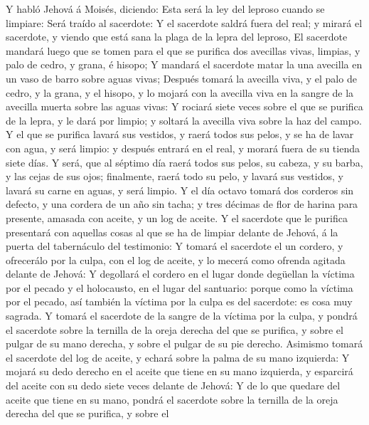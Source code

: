  Y habló Jehová á Moisés, diciendo:  Esta
será la ley del leproso cuando se limpiare: Será traído al sacerdote:
 Y el sacerdote saldrá fuera del real; y mirará el
sacerdote, y viendo que está sana la plaga de la lepra del leproso,
 El sacerdote mandará luego que se tomen para el que se
purifica dos avecillas vivas, limpias, y palo de cedro, y grana, é
hisopo;  Y mandará el sacerdote matar la una avecilla en
un vaso de barro sobre aguas vivas;  Después tomará la
avecilla viva, y el palo de cedro, y la grana, y el hisopo, y lo mojará
con la avecilla viva en la sangre de la avecilla muerta sobre las aguas
vivas:  Y rociará siete veces sobre el que se purifica de
la lepra, y le dará por limpio; y soltará la avecilla viva sobre la haz
del campo.  Y el que se purifica lavará sus vestidos, y
raerá todos sus pelos, y se ha de lavar con agua, y será limpio: y
después entrará en el real, y morará fuera de su tienda siete días.
 Y será, que al séptimo día raerá todos sus pelos, su
cabeza, y su barba, y las cejas de sus ojos; finalmente, raerá todo su
pelo, y lavará sus vestidos, y lavará su carne en aguas, y será limpio.
 Y el día octavo tomará dos corderos sin defecto, y una
cordera de un año sin tacha; y tres décimas de flor de harina para
presente, amasada con aceite, y un log de aceite.  Y el
sacerdote que le purifica presentará con aquellas cosas al que se ha de
limpiar delante de Jehová, á la puerta del tabernáculo del testimonio:
 Y tomará el sacerdote el un cordero, y ofrecerálo por la
culpa, con el log de aceite, y lo mecerá como ofrenda agitada delante de
Jehová:  Y degollará el cordero en el lugar donde
degüellan la víctima por el pecado y el holocausto, en el lugar del
santuario: porque como la víctima por el pecado, así también la víctima
por la culpa es del sacerdote: es cosa muy sagrada.  Y
tomará el sacerdote de la sangre de la víctima por la culpa, y pondrá el
sacerdote sobre la ternilla de la oreja derecha del que se purifica, y
sobre el pulgar de su mano derecha, y sobre el pulgar de su pie derecho.
 Asimismo tomará el sacerdote del log de aceite, y echará
sobre la palma de su mano izquierda:  Y mojará su dedo
derecho en el aceite que tiene en su mano izquierda, y esparcirá del
aceite con su dedo siete veces delante de Jehová:  Y de
lo que quedare del aceite que tiene en su mano, pondrá el sacerdote
sobre la ternilla de la oreja derecha del que se purifica, y sobre el
